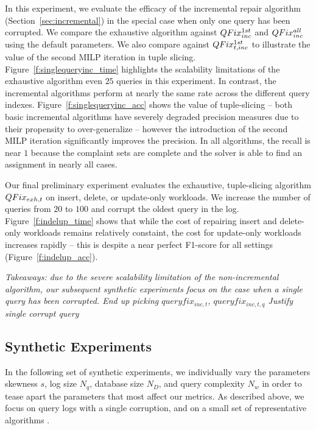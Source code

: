 In this experiment, we evaluate the efficacy of the incremental repair algorithm (Section~\ref{sec:incremental})
in the special case when only one query has been corrupted.  We compare the exhaustive 
algorithm against $QFix_{inc}^{1st}$ and $QFix_{inc}^{all}$ using the default parameters.
We also compare against $QFix_{t,inc}^{1st}$ to illustrate the value of the second MILP iteration in tuple slicing.
Figure~\ref{f:singlequeryinc_time} highlights the scalability limitations of the exhaustive algorithm 
even $25$ queries in this experiment.  In contrast, the incremental algorithms perform at nearly the same rate
across the different query indexes.  Figure~\ref{f:singlequeryinc_acc} shows the value of tuple-slicing --
both basic incremental algorithms have severely degraded precision measures due to their propensity to over-generalize
-- however the introduction of the second MILP iteration significantly improves the precision.  
In all algorithms, the recall is near $1$ because the complaint sets are complete and the solver is able to find 
an assignment in nearly all cases.


\label{sec:indelup}
Our final preliminary experiment evaluates the exhaustive, tuple-slicing algorithm 
$QFix_{exh,t}$ on insert, delete, or update-only workloads.
We increase the number of queries from $20$ to $100$ and corrupt the oldest query in the log.  
Figure~\ref{f:indelup_time} shows that while the cost of repairing insert and delete-only workloads
remains relatively constaint, the cost for update-only workloads increases rapidly -- this is
despite a near perfect F1-score for all settings (Figure~\ref{f:indelup_acc}).


{\it Takeaways: 
due to the severe scalability limitation of the non-incremental algorithm, our subsequent synthetic experiments focus
on the case when a single query has been corrupted.
End up picking $queryfix_{inc,t}$, $queryfix_{inc,t,q}$
Justify single corrupt query
}


\subsection{Synthetic Experiments}
In the following set of synthetic experiments, we individually vary 
the parameters skewness $s$, log size $N_q$, database size $N_D$, and
query complexity $N_w$ in order to tease apart the parameters that most affect our metrics.
As described above, we focus on query logs with a single corruption,
and on a small set of representative algorithms .


